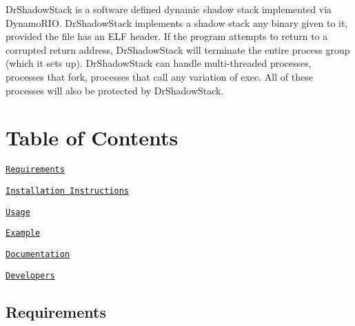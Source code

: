Dr\+Shadow\+Stack is a software defined dynamic shadow stack implemented via Dynamo\+R\+IO. Dr\+Shadow\+Stack implements a shadow stack any binary given to it, provided the file has an E\+LF header. If the program attempts to return to a corrupted return address, Dr\+Shadow\+Stack will terminate the entire process group (which it sets up). Dr\+Shadow\+Stack can handle multi-\/threaded processes, processes that fork, processes that call any variation of exec. All of these processes will also be protected by Dr\+Shadow\+Stack.

\section*{Table of Contents}


\begin{DoxyEnumerate}
\item \href{#requirements}{\tt Requirements}
\end{DoxyEnumerate}
\begin{DoxyEnumerate}
\item \href{#installation-instructions}{\tt Installation Instructions}
\end{DoxyEnumerate}
\begin{DoxyEnumerate}
\item \href{#usage}{\tt Usage}
\end{DoxyEnumerate}
\begin{DoxyEnumerate}
\item \href{#example}{\tt Example}
\end{DoxyEnumerate}
\begin{DoxyEnumerate}
\item \href{#documentation}{\tt Documentation}
\end{DoxyEnumerate}
\begin{DoxyEnumerate}
\item \href{#developers}{\tt Developers}
\end{DoxyEnumerate}

\subsection*{Requirements}


